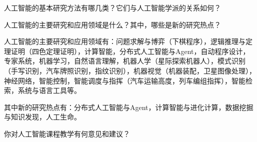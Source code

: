 \begin{question}
人工智能的基本研究方法有哪几类？它们与人工智能学派的关系如何？
\end{question}
\begin{solution}
\end{solution}

\begin{question}
人工智能的主要研究和应用领域是什么？其中，哪些是新的研究热点？
\end{question}
\begin{solution}
人工智能的主要研究和应用领域有：问题求解与博弈（下棋程序），逻辑推理与定理证明（四色定理证明），计算智能，分布式人工智能与Agent，自动程序设计，专家系统，机器学习，自然语言理解，机器人学（星际探索机器人），模式识别（手写识别，汽车牌照识别，指纹识别），机器视觉（机器装配，卫星图像处理），神经网络，智能控制，智能调度与指挥（汽车运输高度，列车编组指挥），智能检索，系统与语言工具等。 \par
其中新的研究热点有：分布式人工智能与Agent，计算智能与进化计算，数据挖掘与知识发现，人工生命。
\end{solution}

\begin{question}
你对人工智能课程教学有何意见和建议？
\end{question}